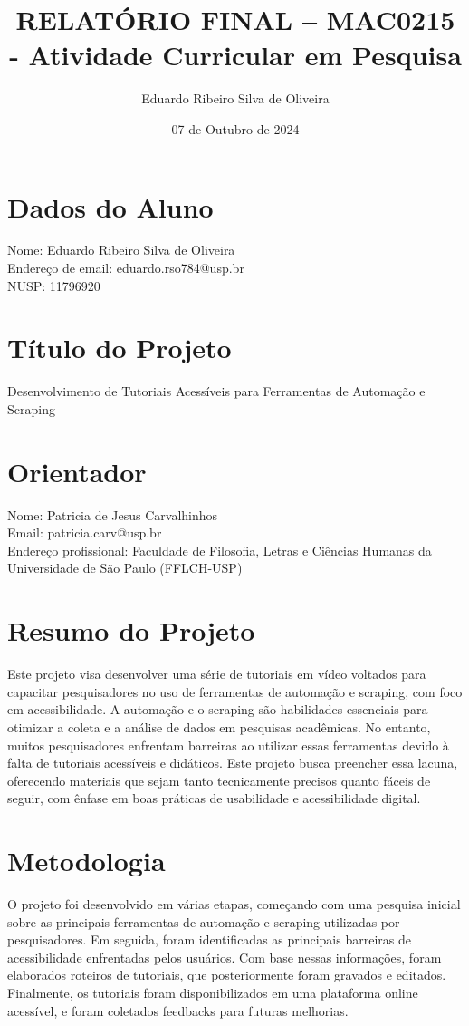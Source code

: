 \documentclass{article}
\title{RELATÓRIO FINAL – MAC0215 - Atividade Curricular em Pesquisa}
\author{Eduardo Ribeiro Silva de Oliveira}
\date{07 de Outubro de 2024}
\begin{document}
\maketitle

\section*{Dados do Aluno}
Nome: Eduardo Ribeiro Silva de Oliveira\\
Endereço de email: eduardo.rso784@usp.br\\
NUSP: 11796920

\section*{Título do Projeto}
Desenvolvimento de Tutoriais Acessíveis para Ferramentas de Automação e Scraping

\section*{Orientador}
Nome: Patricia de Jesus Carvalhinhos\\
Email: patricia.carv@usp.br\\
Endereço profissional: Faculdade de Filosofia, Letras e Ciências Humanas da Universidade de São Paulo (FFLCH-USP)

\section*{Resumo do Projeto}
Este projeto visa desenvolver uma série de tutoriais em vídeo voltados para capacitar pesquisadores no uso de ferramentas de automação e scraping, com foco em acessibilidade. A automação e o scraping são habilidades essenciais para otimizar a coleta e a análise de dados em pesquisas acadêmicas. No entanto, muitos pesquisadores enfrentam barreiras ao utilizar essas ferramentas devido à falta de tutoriais acessíveis e didáticos. Este projeto busca preencher essa lacuna, oferecendo materiais que sejam tanto tecnicamente precisos quanto fáceis de seguir, com ênfase em boas práticas de usabilidade e acessibilidade digital.

\section*{Metodologia}
O projeto foi desenvolvido em várias etapas, começando com uma pesquisa inicial sobre as principais ferramentas de automação e scraping utilizadas por pesquisadores. Em seguida, foram identificadas as principais barreiras de acessibilidade enfrentadas pelos usuários. Com base nessas informações, foram elaborados roteiros de tutoriais, que posteriormente foram gravados e editados. Finalmente, os tutoriais foram disponibilizados em uma plataforma online acessível, e foram coletados feedbacks para futuras melhorias.
\end{document}
